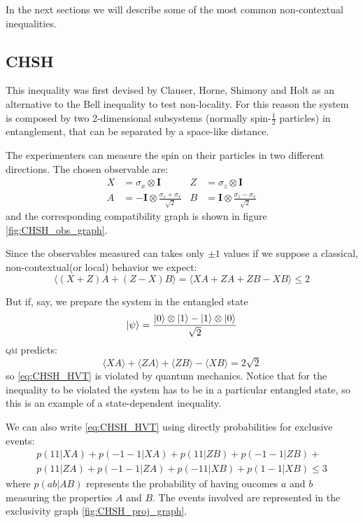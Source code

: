 \documentclass[a4paper]{article}
\newcommand{\acron}[1]{\textsc{#1}}
\newcommand{\QM}{\acron{qm}}
\newcommand{\I}{\mathbf{I}}
\theoremstyle{definition}
\begin{document}
In the next sections we will describe some of the most common non-contextual
inequalities.

\subsection{CHSH}
\label{sec:CHSH}
This inequality was first devised by Clauser, Horne, Shimony and Holt as an
alternative to the Bell inequality to test non-locality.
For this reason the system is composed by two 2-dimensional subsystems
(normally spin-$\frac{1}{2}$ particles) in
entanglement, that can be separated by a space-like distance.

The experimenters can measure the spin on their particles in two different directions.
The chosen observable are:
\begin{align}
    X &= \sigma_x \otimes \I &
        Z &= \sigma_z \otimes \I \\
    A &=  - \I \otimes \frac{\sigma_z + \sigma_x}{\sqrt{2}} 
        & B &=  \I \otimes \frac{\sigma_z - \sigma_x}{\sqrt{2}} 
    \label{eq:CHSH_obs}
\end{align}
and the corresponding compatibility graph is shown in figure
\ref{fig:CHSH_obs_graph}.

Since the observables measured can takes only $\pm 1$ values if we suppose a classical,
non-contextual(or local) behavior we expect:
\begin{equation}
    \langle{(X + Z) A + (Z - X) B}\rangle = 
    \langle{XA + ZA + ZB - XB}\rangle \le 2
    \label{eq:CHSH_HVT}
\end{equation}

But if, say, we prepare the system in the entangled state
\begin{equation}
    \Ket{\psi} = \frac{\Ket{0}\otimes\Ket{1} -
    \Ket{1}\otimes\Ket{0}}{\sqrt{2}} 
    \label{eq:bell_state_psim}
\end{equation}
\QM{} predicts:
\begin{equation}
    \langle{XA}\rangle + \langle{ZA}\rangle + \langle{ZB}\rangle
    - \langle{XB}\rangle = 2\sqrt{2}
    \label{eq:CHSH_QM}
\end{equation}
so \eqref{eq:CHSH_HVT} is violated by quantum mechanics.
Notice that for the inequality to be violated the system has to be in a particular entangled
state, so this is an example of a state-dependent inequality.

We can also write \eqref{eq:CHSH_HVT} using directly probabilities for exclusive events:
\begin{multline}
    p(11| X A) + p(-1-1| X A) +
    p(11| Z B) + p(-1-1| Z B) +\\
    p(11| Z A) + p(-1-1| Z A) +
    p(-11| X B) + p(1-1| X B) \le 3
\end{multline}
where $p(ab|AB)$ represents the probability of having oucomes $a$ and $b$
measuring the properties $A$ and $B$.
The events involved are represented in the exclusivity graph \ref{fig:CHSH_proj_graph}.
\end{document}
